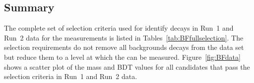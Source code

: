 \subsection{Summary}
\label{sec:BFsummary}
The complete set of selection criteria used for identify \bmumu decays in Run~1 and Run~2 data for the \BF measurements is listed in Tables~\ref{tab:BFfullselection}. %
The selection requirements do not remove all backgrounds decays from the data set but reduce them to a level at which the \BFs can be measured. Figure~\ref{fig:BFdata} shows a scatter plot of the mass and BDT values for all candidates that pass the selection criteria in Run~1 and Run~2 data. %
